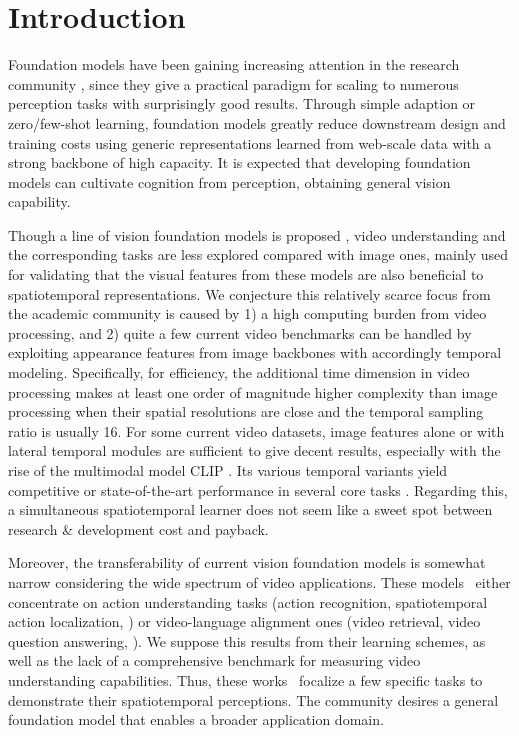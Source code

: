 
\section{Introduction}
\label{sec:introduction}

Foundation models have been gaining increasing attention in the research community \cite{bommasani2021opportunities,akbari2021vatt,shao2021intern}, since they give a practical paradigm for scaling to numerous perception tasks with surprisingly good results. Through simple adaption or zero/few-shot learning, foundation models greatly reduce downstream design and training costs using generic representations learned from web-scale data with a strong backbone of high capacity. It is expected that developing foundation models can cultivate cognition from perception, obtaining general vision capability.

Though a line of vision foundation models is proposed \cite{CLIP,align,florence,unicl,simvlm,ofa,coca,beit3,beit,barham2022pathways}, video understanding and the corresponding tasks are less explored compared with image ones, mainly used for validating that the visual features from these models are also beneficial to spatiotemporal representations. We conjecture this relatively scarce focus from the academic community is caused by 1) a high computing burden from video processing, and 2) quite a few current video benchmarks can be handled by exploiting appearance features from image backbones with accordingly temporal modeling. Specifically, for efficiency, the additional time dimension in video processing makes at least one order of magnitude higher complexity than image processing when their spatial resolutions are close and the temporal sampling ratio is usually 16. 
For some current video datasets, image features alone or with lateral temporal modules are sufficient to give decent results, especially with the rise of the multimodal model CLIP \cite{CLIP}. Its various temporal variants yield competitive or state-of-the-art performance in several core tasks \cite{clip4clip,ma2022x}. 
Regarding this, a simultaneous spatiotemporal learner does not seem like a sweet spot between research \& development cost and payback.

Moreover, the transferability of current vision foundation models is somewhat narrow considering the wide spectrum of video applications. These models~\cite{videomae,mtv,maskfeat,all_in_one} either concentrate on action understanding tasks (\eg action recognition, spatiotemporal action localization, \etc) or video-language alignment ones (\eg video retrieval, video question answering, \etc). We suppose this results from their learning schemes, as well as the lack of a comprehensive benchmark for measuring video understanding capabilities. Thus, these works~\cite{videomae,mtv,maskfeat,all_in_one} focalize a few specific tasks to demonstrate their spatiotemporal perceptions.
The community desires a general foundation model that enables a broader application domain.

